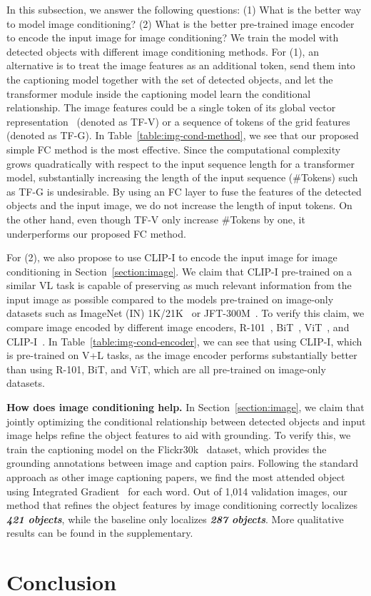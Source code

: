 \documentclass[10pt,twocolumn,letterpaper]{article}
\begin{document}
In this subsection, we answer the following questions: (1) What is the better way to model image conditioning? (2) What is the better pre-trained image encoder to encode the input image for image conditioning?
We train the  model with detected objects with different image conditioning methods.
For (1), an alternative is to treat the image features as an additional token, send them into the captioning model together with the set of detected objects, and let the transformer module inside the captioning model learn the conditional relationship.
The image features could be a single token of its global vector representation~\cite{su2019vl,ji2021improving,zhang2021rstnet} (denoted as TF-V) or a sequence of tokens of the grid features (denoted as TF-G).
In Table~\ref{table:img-cond-method}, we see that our proposed simple FC method is the most effective.
Since the computational complexity grows quadratically with respect to the input sequence length for a transformer model, substantially increasing the length of the input sequence (\#Tokens) such as TF-G is undesirable.
By using an FC layer to fuse the features of the detected objects and the input image, we do not increase the length of input tokens.
On the other hand, even though TF-V only increase \#Tokens by one, it underperforms our proposed FC method.


For (2), we also propose to use CLIP-I to encode the input image for image conditioning in Section~\ref{section:image}.
We claim that CLIP-I pre-trained on a similar VL task is capable of preserving as much relevant information from the input image as possible compared to the models pre-trained on image-only datasets such as ImageNet (IN) 1K/21K~\cite{imagenet_cvpr09} or JFT-300M~\cite{sun2017revisiting}.
To verify this claim, we compare image encoded by different image encoders, R-101~\cite{he2016deep}, BiT~\cite{kolesnikov2020big}, ViT~\cite{dosovitskiy2020vit}, and CLIP-I~\cite{Radford2021LearningTV}.
In Table~\ref{table:img-cond-encoder}, we can see that using CLIP-I, which is pre-trained on V+L tasks, as the image encoder performs substantially better than using R-101, BiT, and ViT, which are all pre-trained on image-only datasets.

\textbf{How does image conditioning help.}
In Section~\ref{section:image}, we claim that jointly optimizing the conditional relationship between detected objects and input image helps refine the object features to aid with grounding. To verify this, we train the captioning model on the Flickr30k~\cite{plummer2015flickr30k} dataset, which provides the grounding annotations between image and caption pairs.
Following the standard approach as other image captioning papers, we find the most attended object using Integrated Gradient~\cite{sundararajan2017axiomatic} for each word.
Out of 1,014 validation images, our method that refines the object features by image conditioning correctly localizes \textit{\textbf{421 objects}}, while the baseline  only localizes \textit{\textbf{287 objects}}.
More qualitative results can be found in the supplementary. \section{Conclusion}
\end{document}
